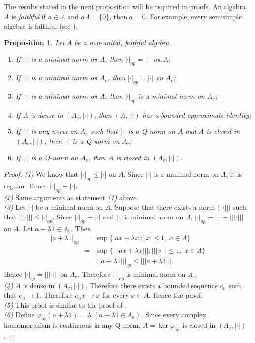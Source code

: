 \documentclass{amsart}
\theoremstyle{plain}
\newtheorem{prop}[defn]{Proposition}
\numberwithin{equation}{section}
\begin{document}
The results stated in the next proposition will be required in proofs. An algebra $A$ is \emph{faithful} if $a \in A$ and $aA = \{0\}$, then $a =0$. For example, every semisimple algebra is faithful (see \cite{BhDe:95}).

\begin{prop}\label{main1} Let $A$ be a non-unital, faithful algebra.
\begin{enumerate}
\item If $|\cdot|$ is a minimal norm on $A$, then $|\cdot|_{op} = |\cdot|$ on $A$;
\item If $|\cdot|$ is a minimal norm on $A_e$, then $|\cdot|_{op} = |\cdot|$ on $A_e$;
\item If $|\cdot|$ is a minimal norm on $A$, then $|\cdot|_{op}$ is a minimal norm on $A_e$;
\item If $A$ is dense in $(A_e, |\cdot|)$, then $(A, |\cdot|)$ has a bounded approximate identity;
\item If $|\cdot|$ is any norm on $A_e$ such that $|\cdot|$ is a Q-norm on $A$ and $A$ is closed in $(A_e, |\cdot|)$, then $|\cdot|$ is a Q-norm on $A_e$;
\item If $|\cdot|$ is a Q-norm on $A_e$, then $A$ is closed in $(A_e, |\cdot|)$.
\end{enumerate}
\end{prop}

\begin{proof}
\emph{(1)} We know that $|\cdot|_{op} \leq |\cdot|$ on $A$. Since $|\cdot|$ is a minimal norm on $A$, it is regular. Hence $|\cdot|_{op} = |\cdot|$.\\
\emph{(2)} Same arguments as statement \emph{(1)} above.\\
\emph{(3)} Let $|\cdot|$ be a minimal norm on $A$. Suppose that there exists a norm $|||\cdot|||$ such that $|||\cdot||| \leq |\cdot|_{op}$. Since $|\cdot|_{op} = |\cdot|$ and $|\cdot|$ is minimal norm on $A$, $|\cdot|_{op} = |\cdot| = |||\cdot|||$ on $A$. Let $a+\lambda1 \in A_e$. Then
\begin{eqnarray*}
|a+\lambda1|_{op} & = & \sup\{|ax+\lambda x|: |x| \leq 1, \; x \in A\}\\
& = &\sup\{|||ax+\lambda x|||: |||x||| \leq 1, \; x \in A\}\\
& = & |||a +\lambda 1|||_{op} \leq |||a + \lambda1|||.
\end{eqnarray*}
Hence $|\cdot|_{op} = |||\cdot|||$ on $A_e$. Therefore $|\cdot|_{op}$ is minimal norm on $A_e$.\\
\emph{(4)} $A$ is dense in $(A_e, |\cdot|)$. Therefore there exists a bounded sequence $e_n$ such that $e_n \longrightarrow 1$. Therefore $e_nx \longrightarrow x$ for every $x \in A$. Hence the proof. \\
\emph{(5)} This proof is similar to the proof of \cite[Theorem 2.7(2)]{DeKa:13}.\\
\emph{(6)} Define $\varphi_{\infty}(a + \lambda 1) = \lambda \; (a+ \lambda 1 \in A_e)$. Since every complex homomorphism is continuous in any Q-norm, $A = \ker{\varphi_{\infty}}$ is closed in $(A_e, |\cdot|)$.
\end{proof}
\end{document}
